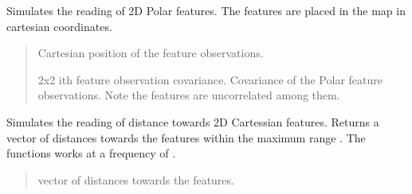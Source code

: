 \documentclass[letterpaper,10pt,english]{sphinxmanual}
\begin{document}
\begin{fulllineitems}
\begin{fulllineitems}
\label{\detokenize{robot_simulation:AUV4DOFSimulatedRobot.AUV4DOFSimulatedRobot.ReadPolar2DFeature}}
\pysigstartsignatures
{}
\pysigstopsignatures
\sphinxAtStartPar
Simulates the reading of 2D Polar features. The features are placed in the map in cartesian coordinates.
\begin{quote}\begin{description}
\sphinxAtStartPar
\begin{description}
\sphinxAtStartPar
Cartesian position of the feature observations.

\sphinxAtStartPar
2x2 i\sphinxhyphen{}th feature observation covariance.
Covariance of the Polar feature observations. Note the features are uncorrelated among them.

\end{description}


\end{description}\end{quote}

\end{fulllineitems}


\begin{fulllineitems}
\label{\detokenize{robot_simulation:AUV4DOFSimulatedRobot.AUV4DOFSimulatedRobot.ReadRanges}}
\pysigstartsignatures
{}
\pysigstopsignatures
\sphinxAtStartPar
Simulates the reading of distance towards 2D Cartessian features. Returns a vector of distances towards the features within the maximum range .
The functions works at a frequency of .
\begin{quote}\begin{description}
\sphinxAtStartPar
vector of distances towards the features.

\end{description}\end{quote}


\end{fulllineitems}
\end{fulllineitems}
\end{document}
